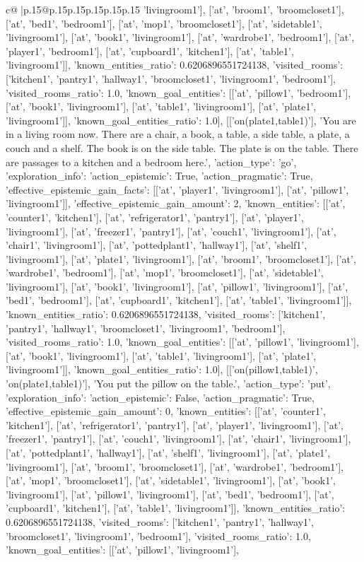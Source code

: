 \documentclass{article}
\begin{document}
{\begin{supertabular}{c@{$\;$}|p{.15\linewidth}@{}p{.15\linewidth}p{.15\linewidth}p{.15\linewidth}p{.15\linewidth}p{.15\linewidth}}
{{{'livingroom1'], ['at', 'broom1', 'broomcloset1'], ['at', 'bed1', 'bedroom1'], ['at', 'mop1', 'broomcloset1'], ['at', 'sidetable1', 'livingroom1'], ['at', 'book1', 'livingroom1'], ['at', 'wardrobe1', 'bedroom1'], ['at', 'player1', 'bedroom1'], ['at', 'cupboard1', 'kitchen1'], ['at', 'table1', 'livingroom1']], 'known_entities_ratio': 0.6206896551724138, 'visited_rooms': ['kitchen1', 'pantry1', 'hallway1', 'broomcloset1', 'livingroom1', 'bedroom1'], 'visited_rooms_ratio': 1.0, 'known_goal_entities': [['at', 'pillow1', 'bedroom1'], ['at', 'book1', 'livingroom1'], ['at', 'table1', 'livingroom1'], ['at', 'plate1', 'livingroom1']], 'known_goal_entities_ratio': 1.0}}], [['on(plate1,table1)'], 'You are in a living room now. There are a chair, a book, a table, a side table, a plate, a couch and a shelf. The book is on the side table. The plate is on the table. There are passages to a kitchen and a bedroom here.', {'action_type': 'go', 'exploration_info': {'action_epistemic': True, 'action_pragmatic': True, 'effective_epistemic_gain_facts': [['at', 'player1', 'livingroom1'], ['at', 'pillow1', 'livingroom1']], 'effective_epistemic_gain_amount': 2, 'known_entities': [['at', 'counter1', 'kitchen1'], ['at', 'refrigerator1', 'pantry1'], ['at', 'player1', 'livingroom1'], ['at', 'freezer1', 'pantry1'], ['at', 'couch1', 'livingroom1'], ['at', 'chair1', 'livingroom1'], ['at', 'pottedplant1', 'hallway1'], ['at', 'shelf1', 'livingroom1'], ['at', 'plate1', 'livingroom1'], ['at', 'broom1', 'broomcloset1'], ['at', 'wardrobe1', 'bedroom1'], ['at', 'mop1', 'broomcloset1'], ['at', 'sidetable1', 'livingroom1'], ['at', 'book1', 'livingroom1'], ['at', 'pillow1', 'livingroom1'], ['at', 'bed1', 'bedroom1'], ['at', 'cupboard1', 'kitchen1'], ['at', 'table1', 'livingroom1']], 'known_entities_ratio': 0.6206896551724138, 'visited_rooms': ['kitchen1', 'pantry1', 'hallway1', 'broomcloset1', 'livingroom1', 'bedroom1'], 'visited_rooms_ratio': 1.0, 'known_goal_entities': [['at', 'pillow1', 'livingroom1'], ['at', 'book1', 'livingroom1'], ['at', 'table1', 'livingroom1'], ['at', 'plate1', 'livingroom1']], 'known_goal_entities_ratio': 1.0}}], [['on(pillow1,table1)', 'on(plate1,table1)'], 'You put the pillow on the table.', {'action_type': 'put', 'exploration_info': {'action_epistemic': False, 'action_pragmatic': True, 'effective_epistemic_gain_amount': 0, 'known_entities': [['at', 'counter1', 'kitchen1'], ['at', 'refrigerator1', 'pantry1'], ['at', 'player1', 'livingroom1'], ['at', 'freezer1', 'pantry1'], ['at', 'couch1', 'livingroom1'], ['at', 'chair1', 'livingroom1'], ['at', 'pottedplant1', 'hallway1'], ['at', 'shelf1', 'livingroom1'], ['at', 'plate1', 'livingroom1'], ['at', 'broom1', 'broomcloset1'], ['at', 'wardrobe1', 'bedroom1'], ['at', 'mop1', 'broomcloset1'], ['at', 'sidetable1', 'livingroom1'], ['at', 'book1', 'livingroom1'], ['at', 'pillow1', 'livingroom1'], ['at', 'bed1', 'bedroom1'], ['at', 'cupboard1', 'kitchen1'], ['at', 'table1', 'livingroom1']], 'known_entities_ratio': 0.6206896551724138, 'visited_rooms': ['kitchen1', 'pantry1', 'hallway1', 'broomcloset1', 'livingroom1', 'bedroom1'], 'visited_rooms_ratio': 1.0, 'known_goal_entities': [['at', 'pillow1', 'livingroom1'], }}}
\end{supertabular}}
\end{document}
